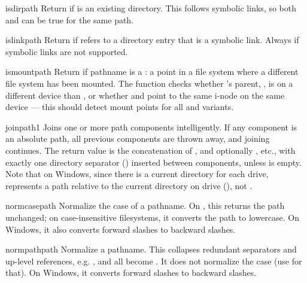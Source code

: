 \begin{funcdesc}{isdir}{path}
Return  if  is an existing directory.  This follows
symbolic links, so both  and  can
be true for the same path.
\end{funcdesc}

\begin{funcdesc}{islink}{path}
Return  if  refers to a directory entry that is a
symbolic link.  Always  if symbolic links are not supported.
\end{funcdesc}

\begin{funcdesc}{ismount}{path}
Return  if pathname  is a : a point in
a file system where a different file system has been mounted.  The
function checks whether 's parent, , is
on a different device than , or whether 
and  point to the same i-node on the same device --- this
should detect mount points for all \UNIX{} and \POSIX{} variants.
\end{funcdesc}

\begin{funcdesc}{join}{path1}
Joins one or more path components intelligently.  If any component is
an absolute path, all previous components are thrown away, and joining
continues.  The return value is the concatenation of , and
optionally , etc., with exactly one directory separator
() inserted between components, unless  is
empty.  Note that on Windows, since there is a current directory for
each drive,  represents a path
relative to the current directory on drive  (), not
.
\end{funcdesc}

\begin{funcdesc}{normcase}{path}
Normalize the case of a pathname.  On \UNIX, this returns the path
unchanged; on case-insensitive filesystems, it converts the path to
lowercase.  On Windows, it also converts forward slashes to backward
slashes.
\end{funcdesc}

\begin{funcdesc}{normpath}{path}
Normalize a pathname.  This collapses redundant separators and
up-level references, e.g. ,  and
 all become .  It does not normalize the
case (use  for that).  On Windows, it converts
forward slashes to backward slashes.
\end{funcdesc}

